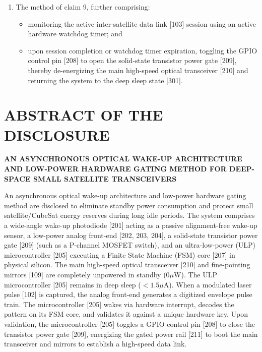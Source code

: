 \documentclass[12pt,a4paper]{article}
\begin{document}
\begin{enumerate}
    \item The method of claim 9, further comprising:
    \begin{itemize}
        \item monitoring the active inter-satellite data link [103] session using an active hardware watchdog timer; and
        \item upon session completion or watchdog timer expiration, toggling the GPIO control pin [208] to open the solid-state transistor power gate [209], thereby de-energizing the main high-speed optical transceiver [210] and returning the system to the deep sleep state [301].
    \end{itemize}

\end{enumerate}

\newpage

\section*{ABSTRACT OF THE DISCLOSURE}
\textbf{AN ASYNCHRONOUS OPTICAL WAKE-UP ARCHITECTURE AND LOW-POWER HARDWARE GATING METHOD FOR DEEP-SPACE SMALL SATELLITE TRANSCEIVERS} \\
\vspace{0.5cm}

An asynchronous optical wake-up architecture and low-power hardware gating method are disclosed to eliminate standby power consumption and protect small satellite/CubeSat energy reserves during long idle periods. The system comprises a wide-angle wake-up photodiode [201] acting as a passive alignment-free wake-up sensor, a low-power analog front-end [202, 203, 204], a solid-state transistor power gate [209] (such as a P-channel MOSFET switch), and an ultra-low-power (ULP) microcontroller [205] executing a Finite State Machine (FSM) core [207] in physical silicon. The main high-speed optical transceiver [210] and fine-pointing mirrors [109] are completely unpowered in standby ($0\mu\text{W}$). The ULP microcontroller [205] remains in deep sleep ($<1.5\mu\text{A}$). When a modulated laser pulse [102] is captured, the analog front-end generates a digitized envelope pulse train. The microcontroller [205] wakes via hardware interrupt, decodes the pattern on its FSM core, and validates it against a unique hardware key. Upon validation, the microcontroller [205] toggles a GPIO control pin [208] to close the transistor power gate [209], energizing the gated power rail [211] to boot the main transceiver and mirrors to establish a high-speed data link.
\end{document}
